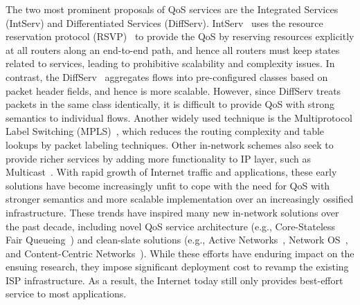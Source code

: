 
The two most prominent proposals of QoS services are
the Integrated Services (IntServ) and Differentiated Services (DiffServ). 
IntServ~\cite{intserv} uses the resource
reservation protocol (RSVP)~\cite{rsvp} to provide the
QoS by reserving resources explicitly at all routers along an end-to-end 
path, and hence all routers must keep states related to services,
leading to prohibitive scalability and complexity issues.
In contrast, the DiffServ~\cite{diffserv}
aggregates flows into pre-configured classes based on packet header 
fields, and hence is  more scalable. However, since DiffServ treats 
packets in the same class identically, it is difficult to provide QoS with
strong semantics to individual flows.
Another widely used technique is the Multiprotocol Label Switching 
(MPLS)~\cite{mpls}, which reduces 
the routing complexity and table lookups by packet labeling techniques.
Other in-network schemes also seek to provide richer services by adding
more functionality to IP layer, such as Multicast~\cite{mbone}.
With rapid growth of Internet traffic and applications, 
these early solutions have become increasingly unfit to cope
with the need for QoS with stronger semantics and 
more scalable implementation over 
an increasingly ossified infrastructure.
These trends have inspired many new in-network solutions 
over the past decade, including novel QoS service architecture (e.g., 
Core-Stateless Fair Queueing~\cite{csfq}) and clean-slate solutions (e.g.,
Active Networks~\cite{active-network}, Network OS~\cite{nox}, and 
Content-Centric Networks~\cite{ccn}).
While these efforts have enduring impact on the ensuing research,
they impose   significant deployment cost to revamp the existing ISP
infrastructure.
As a result, the Internet today still only provides best-effort
service to most applications.


